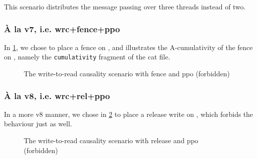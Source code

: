 \documentclass[a4paper]{article}
\begin{document}
This scenario distributes the message passing over three threads instead of
two.  

\subsubsection{\`A la v7, i.e. \textsf{wrc+fence+ppo}}

In \myfig\ref{fig:wrc}, we chose to place a fence on , and illustrates
the A-cumulativity of the fence on , namely the {\tt cumulativity}
fragment of the cat file.

\begin{figure}[!h]
\begin{center}
\end{center}
\vspace*{-8mm}
\caption{The write-to-read causality scenario with fence and ppo (forbidden) \label{fig:wrc}}
\end{figure}



\subsubsection{\`A la v8, i.e. \textsf{wrc+rel+ppo}}

In a more v8 manner, we chose in \myfig\ref{fig:wrc+rel+ppo} to place a release
write on , which forbids the behaviour just as well.

\begin{figure}[!h]
\begin{center}
\end{center}
\vspace*{-8mm}
\caption{The write-to-read causality scenario with release and ppo (forbidden) \label{fig:wrc+rel+ppo}}
\end{figure}

\end{document}
